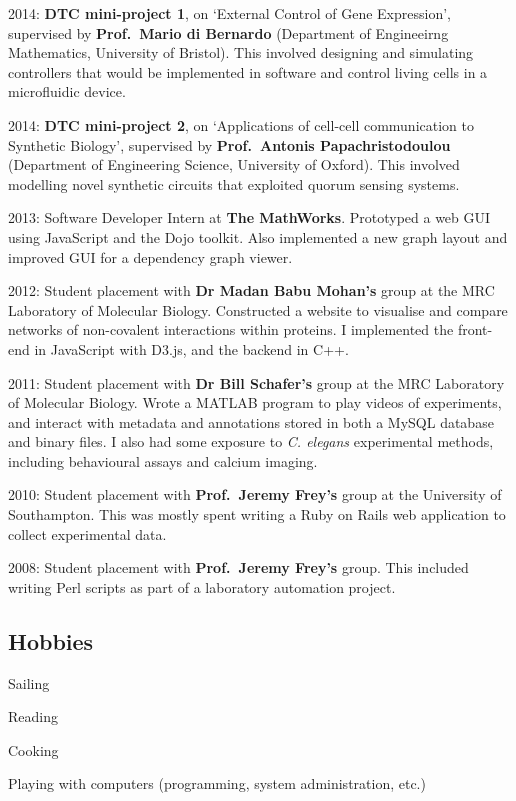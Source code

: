 \documentclass[letterpaper]{article}
\renewenvironment{itemize}{
  \begin{compactitem}{}{
    \setlength{\leftmargin}{1.5em}
  }
}{
  \end{compactitem}
}
\begin{document}
\begin{itemize}
\item
  2014: \textbf{DTC mini-project 1}, on `External Control of Gene
  Expression', supervised by \textbf{Prof.~Mario di Bernardo}
  (Department of Engineeirng Mathematics, University of Bristol). This
  involved designing and simulating controllers that would be
  implemented in software and control living cells in a microfluidic
  device.
\item
  2014: \textbf{DTC mini-project 2}, on `Applications of cell-cell
  communication to Synthetic Biology', supervised by
  \textbf{Prof.~Antonis Papachristodoulou} (Department of Engineering
  Science, University of Oxford). This involved modelling novel
  synthetic circuits that exploited quorum sensing systems.
\item
  2013: Software Developer Intern at \textbf{The MathWorks}. Prototyped
  a web GUI using JavaScript and the Dojo toolkit. Also implemented a
  new graph layout and improved GUI for a dependency graph viewer.
\item
  2012: Student placement with \textbf{Dr Madan Babu Mohan's} group at
  the MRC Laboratory of Molecular Biology. Constructed a website to
  visualise and compare networks of non-covalent interactions within
  proteins. I implemented the front-end in JavaScript with D3.js, and
  the backend in C++.
\item
  2011: Student placement with \textbf{Dr Bill Schafer's} group at the
  MRC Laboratory of Molecular Biology. Wrote a MATLAB program to play
  videos of experiments, and interact with metadata and annotations
  stored in both a MySQL database and binary files. I also had some
  exposure to \emph{C. elegans} experimental methods, including
  behavioural assays and calcium imaging.
\item
  2010: Student placement with \textbf{Prof.~Jeremy Frey's} group at the
  University of Southampton. This was mostly spent writing a Ruby on
  Rails web application to collect experimental data.
\item
  2008: Student placement with \textbf{Prof.~Jeremy Frey's} group. This
  included writing Perl scripts as part of a laboratory automation
  project.
\end{itemize}

\subsection{Hobbies}\label{hobbies}

\begin{itemize}
\tightlist
\item
  Sailing
\item
  Reading
\item
  Cooking
\item
  Playing with computers (programming, system administration, etc.)
\end{itemize}

\vspace{0.3 cm}
\end{document}
